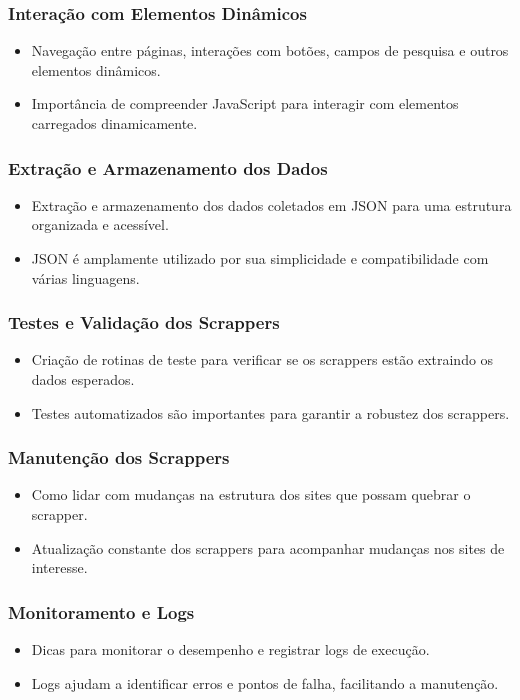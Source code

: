 \documentclass{beamer}
\begin{document}
\begin{frame}
  \frametitle{Interação com Elementos Dinâmicos}
  \begin{itemize}
    \item Navegação entre páginas, interações com botões, campos de pesquisa e outros elementos dinâmicos.
    \item Importância de compreender JavaScript para interagir com elementos carregados dinamicamente.
  \end{itemize}
\end{frame}

\begin{frame}
  \frametitle{Extração e Armazenamento dos Dados}
  \begin{itemize}
    \item Extração e armazenamento dos dados coletados em JSON para uma estrutura organizada e acessível.
    \item JSON é amplamente utilizado por sua simplicidade e compatibilidade com várias linguagens.
  \end{itemize}
\end{frame}

\begin{frame}
  \frametitle{Testes e Validação dos Scrappers}
  \begin{itemize}
    \item Criação de rotinas de teste para verificar se os scrappers estão extraindo os dados esperados.
    \item Testes automatizados são importantes para garantir a robustez dos scrappers.
  \end{itemize}
\end{frame}

\begin{frame}
  \frametitle{Manutenção dos Scrappers}
  \begin{itemize}
    \item Como lidar com mudanças na estrutura dos sites que possam quebrar o scrapper.
    \item Atualização constante dos scrappers para acompanhar mudanças nos sites de interesse.
  \end{itemize}
\end{frame}

\begin{frame}
  \frametitle{Monitoramento e Logs}
  \begin{itemize}
    \item Dicas para monitorar o desempenho e registrar logs de execução.
    \item Logs ajudam a identificar erros e pontos de falha, facilitando a manutenção.
  \end{itemize}
\end{frame}
\end{document}
